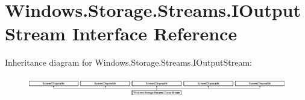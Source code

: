 \hypertarget{interface_windows_1_1_storage_1_1_streams_1_1_i_output_stream}{}\section{Windows.\+Storage.\+Streams.\+I\+Output\+Stream Interface Reference}
\label{interface_windows_1_1_storage_1_1_streams_1_1_i_output_stream}
Inheritance diagram for Windows.\+Storage.\+Streams.\+I\+Output\+Stream\+:\begin{figure}[H]
\begin{center}
\leavevmode
\includegraphics[height=0.896000cm]{interface_windows_1_1_storage_1_1_streams_1_1_i_output_stream}
\end{center}
\end{figure}

